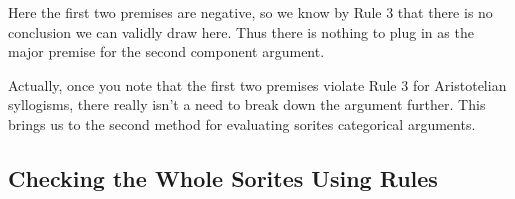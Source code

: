 {Here the first two premises are negative, so we know by Rule 3 that there is no conclusion we can validly draw here. Thus there is nothing to plug in as the major premise for the second component argument. 

\begin{center}
\end{center}

Actually, once you note that the first two premises violate Rule 3 for Aristotelian syllogisms, there really isn't a need to break down the argument further. This brings us to the second method for evaluating sorites categorical arguments. 

\subsection{Checking the Whole Sorites Using Rules}

}
